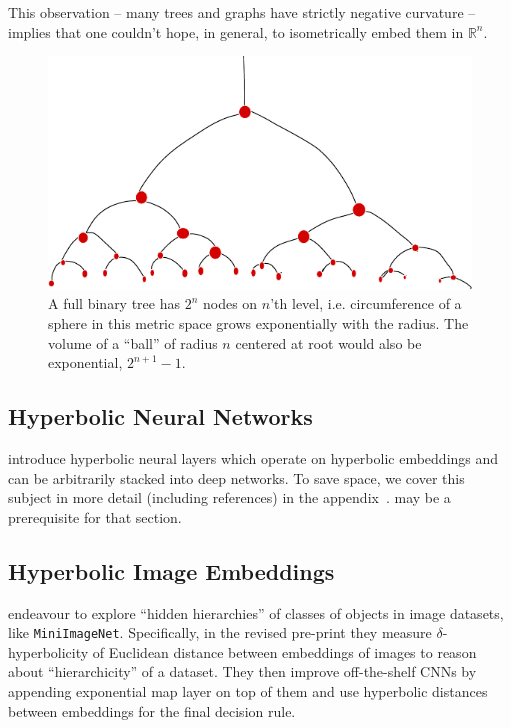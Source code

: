 This observation -- many trees and graphs have strictly negative curvature --
implies that one couldn't hope, in general, to isometrically embed them in \(
\mathbb{R}^n \).

\begin{figure}[ht]\center
    \includegraphics[width=.9\textwidth]{art/binary-tree-circumference-min.pdf}
    \caption{A full binary tree has \( 2^n \) nodes on \( n \)'th level, i.e.
    circumference of a sphere in this metric space grows exponentially with the
    radius. The volume of a ``ball'' of radius \( n \) centered at root would
    also be exponential, \( 2^{n+1} - 1 \).}
    \label{fig:binaryTreeCircumference}
\end{figure}

\subsection*{Hyperbolic Neural Networks}

\citet{ganeaHNNs} introduce hyperbolic neural layers which operate on
hyperbolic embeddings and can be arbitrarily stacked into deep networks.  To
save space, we cover this subject in more detail (including references) in the
appendix~.  may be
a prerequisite for that section.

\subsection*{Hyperbolic Image Embeddings}

\citet{khrulkov} endeavour to explore ``hidden hierarchies'' of classes of
objects in image datasets, like \texttt{MiniImageNet}. Specifically, in the
revised pre-print they measure \( \delta \)-hyperbolicity of Euclidean distance
between embeddings of images to reason about ``hierarchicity'' of a dataset.
They then improve off-the-shelf CNNs by appending exponential map layer on top
of them and use hyperbolic distances between embeddings for the final
decision rule.

